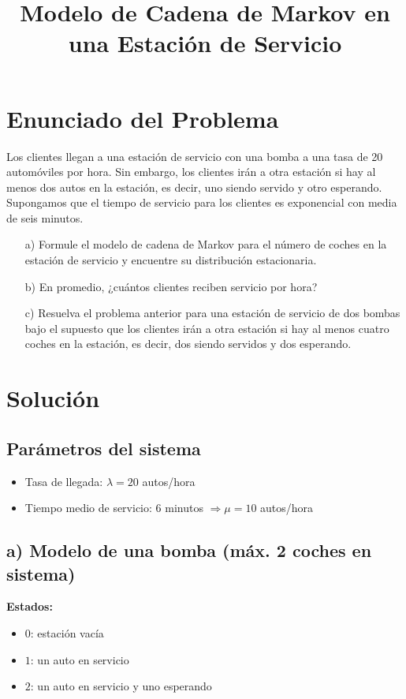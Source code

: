 \documentclass[12pt]{article}
\title{Modelo de Cadena de Markov en una Estación de Servicio}
\author{}
\date{}
\begin{document}
\maketitle

\section*{Enunciado del Problema}

Los clientes llegan a una estación de servicio con una bomba a una tasa de 20 automóviles por hora. Sin embargo, los clientes irán a otra estación si hay al menos dos autos en la estación, es decir, uno siendo servido y otro esperando. Supongamos que el tiempo de servicio para los clientes es exponencial con media de seis minutos.

\begin{itemize}
    \item[a)] Formule el modelo de cadena de Markov para el número de coches en la estación de servicio y encuentre su distribución estacionaria.
    \item[b)] En promedio, ¿cuántos clientes reciben servicio por hora?
    \item[c)] Resuelva el problema anterior para una estación de servicio de dos bombas bajo el supuesto que los clientes irán a otra estación si hay al menos cuatro coches en la estación, es decir, dos siendo servidos y dos esperando.
\end{itemize}

\section*{Solución}

\subsection*{Parámetros del sistema}
\begin{itemize}
    \item Tasa de llegada: $\lambda = 20$ autos/hora
    \item Tiempo medio de servicio: 6 minutos $\Rightarrow \mu = 10$ autos/hora
\end{itemize}

\subsection*{a) Modelo de una bomba (máx. 2 coches en sistema)}

\textbf{Estados:}
\begin{itemize}
    \item $0$: estación vacía
    \item $1$: un auto en servicio
    \item $2$: un auto en servicio y uno esperando
\end{itemize}
\end{document}
